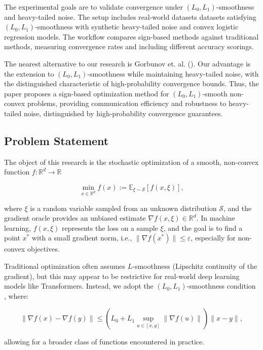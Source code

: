 \documentclass[12pt]{article}
\begin{document}
The experimental goals are to validate convergence under $(L_0, L_1)$-smoothness and heavy-tailed noise. The setup includes real-world datasets datasets satisfying $(L_0, L_1)$-smoothness with synthetic heavy-tailed noise and convex logistic regression models. The workflow compares sign-based methods against traditional methods, measuring convergence rates and including different accuracy scorings.

The nearest alternative to our research is Gorbunov et. al. (\cite{gorbunov}). Our advantage is the extension to $(L_0, L_1)$-smoothness while maintaining heavy-tailed noise, with the distinguished characteristic of high-probability convergence bounds. Thus, the paper proposes a sign-based optimization method for $(L_0, L_1)$-smooth non-convex problems, providing communication efficiency and robustness to heavy-tailed noise, distinguished by high-probability convergence guarantees.

\subsection*{Problem Statement}

The object of this research is the stochastic optimization of a smooth, non-convex function $f: \mathbb{R}^d \to \mathbb{R}$

\[
\min_{x \in \mathbb{R}^d} f(x) := \mathbb{E}_{\xi \sim \mathcal{S}} [f(x, \xi)],
\]

where $\xi$ is a random variable sampled from an unknown distribution $\mathcal{S}$, and the gradient oracle provides an unbiased estimate $\nabla f(x, \xi) \in \mathbb{R}^d$. In machine learning, $f(x, \xi)$ represents the loss on a sample $\xi$, and the goal is to find a point $x^*$ with a small gradient norm, i.e., $\|\nabla f(x^*)\| \leq \varepsilon$, especially for non-convex objectives.

Traditional optimization often assumes $L$-smoothness (Lipschitz continuity of the gradient), but this may appear to be restrictive for real-world deep learning models like Transformers. Instead, we adopt the $(L_0, L_1)$-smoothness condition \cite{gorbunov}, where:

\[
\|\nabla f(x) - \nabla f(y)\| \leq \left(L_0 + L_1 \sup_{u \in [x,y]} \|\nabla f(u)\|\right) \|x - y\|,
\]

allowing for a broader class of functions encountered in practice.
\end{document}
